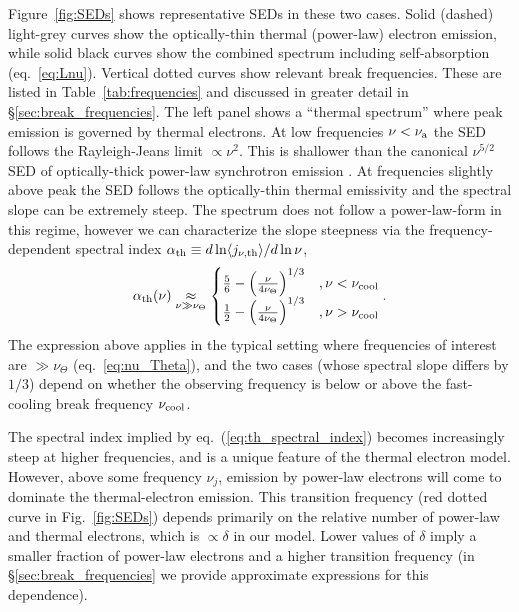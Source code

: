 \documentclass[twocolumn]{aastex63}
\begin{document}
Figure~\ref{fig:SEDs} shows representative SEDs in these two cases.
Solid (dashed) light-grey curves show the optically-thin thermal (power-law) electron emission, while solid black curves show the combined spectrum including self-absorption (eq.~\ref{eq:Lnu}). 
Vertical dotted curves show relevant break frequencies. These are listed in Table~\ref{tab:frequencies} and discussed in greater detail in \S\ref{sec:break_frequencies}.
The left panel shows a ``thermal spectrum'' where peak emission is governed by thermal electrons.
At low frequencies $\nu < \nu_{\rm a}$ the SED follows the Rayleigh-Jeans limit $\propto \nu^2$. This is shallower than the canonical $\nu^{5/2}$ SED of optically-thick power-law synchrotron emission \citep{Rybicki&Lightman79}.
At frequencies slightly above peak the SED follows the optically-thin thermal emissivity and the spectral slope can be extremely steep. The spectrum does not follow a power-law-form in this regime, however we can characterize the slope steepness via the
frequency-dependent spectral index
$\alpha_{\rm th} \equiv {d\ln \langle j_{\nu,{\rm th}} \rangle}/{d\ln \nu}$,
\begin{equation}
\label{eq:th_spectral_index}
    \alpha_{\rm th}(\nu) 
    \underset{\nu \gg \nu_\Theta}{\approx}
    \begin{cases}
    \frac{5}{6} - \left(\frac{\nu}{4 \nu_\Theta}\right)^{1/3}
    &, \nu < \nu_{\rm cool}
    \\ 
    \frac{1}{2} - \left(\frac{\nu}{4 \nu_\Theta}\right)^{1/3}
    &, \nu > \nu_{\rm cool}
    \end{cases}
    .
\end{equation}
The expression above applies in the typical setting where frequencies of interest are $\gg \nu_\Theta$ (eq.~\ref{eq:nu_Theta}), and the two cases (whose spectral slope differs by $1/3$) depend on whether the observing frequency is below or above the fast-cooling break frequency $\nu_{\rm cool}$.

The spectral index implied by eq.~(\ref{eq:th_spectral_index}) becomes increasingly steep at higher frequencies, and is a unique feature of the thermal electron model. However, above some frequency $\nu_j$, emission by power-law electrons will come to dominate the thermal-electron emission. This transition frequency (red dotted curve in Fig.~\ref{fig:SEDs}) depends primarily on the relative number of power-law and thermal electrons, which is $\propto \delta$ in our model. Lower values of $\delta$ imply a smaller fraction of power-law electrons and a higher transition frequency (in \S\ref{sec:break_frequencies} we provide approximate expressions for this dependence).
\end{document}
